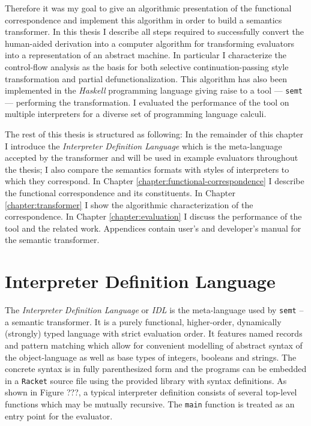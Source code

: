 Therefore it was my goal to give an algorithmic presentation of the functional correspondence and implement this algorithm in order to build a semantics transformer.
In this thesis I describe all steps required to successfully convert the human-aided derivation into a computer algorithm for transforming evaluators into a representation of an abstract machine.
In particular I characterize the control-flow analysis as the basis for both selective continuation-passing style transformation and partial defunctionalization.
This algorithm has also been implemented in the \emph{Haskell} programming language giving raise to a tool --- \texttt{semt} --- performing the transformation.
I evaluated the performance of the tool on multiple interpreters for a diverse set of programming language calculi.

The rest of this thesis is structured as following:
In the remainder of this chapter I introduce the \textit{Interpreter Definition Language} which is the meta-language accepted by the transformer and will be used in example evaluators throughout the thesis; I also compare the semantics formats with styles of interpreters to which they correspond.
In Chapter \ref{chapter:functional-correspondence} I describe the functional correspondence and its constituents.
In Chapter \ref{chapter:transformer} I show the algorithmic characterization of the correspondence.
In Chapter \ref{chapter:evaluation} I discuss the performance of the tool and the related work.
Appendices contain user's and developer's manual for the semantic transformer.

\section{Interpreter Definition Language}
The \emph{Interpreter Definition Language} or \emph{IDL} is the meta-language used by \texttt{semt} -- a semantic transformer.
It is a purely functional, higher-order, dynamically (strongly) typed language with strict evaluation order.
It features named records and pattern matching which allow for convenient modelling of abstract syntax of the object-language as well as base types of integers, booleans and strings.
The concrete syntax is in fully parenthesized form and the programs can be embedded in a \texttt{Racket} source file using the provided library with syntax definitions.
As shown in Figure ???, a typical interpreter definition consists of several top-level functions which may be mutually recursive.
The \texttt{main} function is treated as an entry point for the evaluator.


